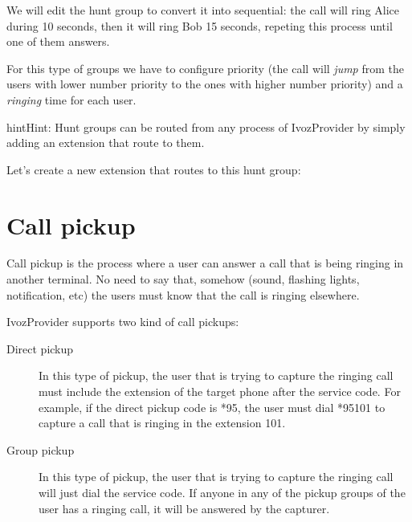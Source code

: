 \documentclass[letterpaper,10pt,english]{sphinxmanual}
\begin{document}
We will edit the hunt group to convert it into sequential: the call will ring
Alice during 10 seconds, then it will ring Bob 15 seconds, repeting this process
until one of them answers.

\noindent{}

For this type of groups we have to configure priority (the call will \emph{jump}
from the users with lower number priority to the ones with higher number
priority) and a \emph{ringing} time for each user.

\noindent{}

\begin{notice}{hint}{Hint:}
Hunt groups can be routed from any process of IvozProvider by simply
adding an extension that route to them.
\end{notice}

Let's create a new extension that routes to this hunt group:

\noindent{}


\section{Call pickup}
\label{company/call_captures:capture-groups}\label{company/call_captures::doc}\label{company/call_captures:call-pickup}
Call pickup is the process where a user can answer a call that is being ringing
in another terminal. No need to say that, somehow (sound, flashing lights,
notification, etc) the users must know that the call is ringing elsewhere.

IvozProvider supports two kind of call pickups:
\begin{description}
\item[{Direct pickup}] \leavevmode{}\label{company/call_captures:term-direct-pickup}
In this type of pickup, the user that is trying to capture the ringing
call must include the extension of the target phone after the service
code. For example, if the direct pickup code is *95, the user must
dial *95101 to capture a call that is ringing in the extension 101.

\item[{Group pickup}] \leavevmode{}\label{company/call_captures:term-group-pickup}
In this type of pickup, the user that is trying to capture the ringing
call will just dial the service code. If anyone in any of the pickup
groups of the user has a ringing call, it will be answered by the
capturer.

\end{description}
\end{document}
